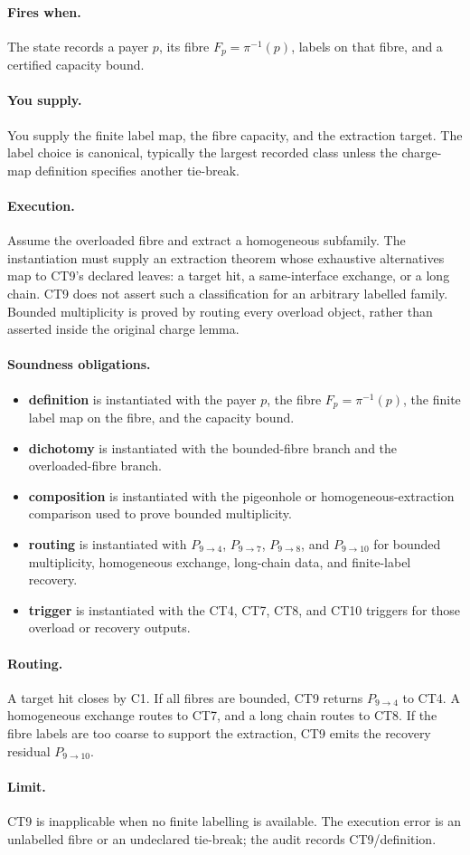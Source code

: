 \documentclass[
  11pt,
]{article}
\providecommand{\tightlist}{%
  \setlength{\itemsep}{0pt}\setlength{\parskip}{0pt}}
\theoremstyle{definition}
\newcommand{\ctpar}[1]{\paragraph{#1.}}
\begin{document}
\ctpar{Fires when}
The state records a payer \(p\), its fibre \(F_p=\pi^{-1}(p)\), labels
on that fibre, and a certified capacity bound.

\ctpar{You supply}
You supply the finite label map, the fibre capacity, and the extraction
target.  The label choice is canonical, typically the largest recorded
class unless the charge-map definition specifies another tie-break.

\ctpar{Execution}
Assume the overloaded fibre and extract a homogeneous subfamily. The
instantiation must supply an extraction theorem whose exhaustive
alternatives map to CT9's declared leaves: a target hit, a same-interface
exchange, or a long chain. CT9 does not assert such a classification for
an arbitrary labelled family. Bounded multiplicity is proved by routing
every overload object, rather than asserted inside the original charge
lemma.

\ctpar{Soundness obligations}
\begin{itemize}
\tightlist
\item \textbf{definition} is instantiated with the payer \(p\), the fibre \(F_p=\pi^{-1}(p)\), the finite label map on the fibre, and the capacity bound.
\item \textbf{dichotomy} is instantiated with the bounded-fibre branch and the overloaded-fibre branch.
\item \textbf{composition} is instantiated with the pigeonhole or homogeneous-extraction comparison used to prove bounded multiplicity.
\item \textbf{routing} is instantiated with \(P_{9\to4}\), \(P_{9\to7}\), \(P_{9\to8}\), and \(P_{9\to10}\) for bounded multiplicity, homogeneous exchange, long-chain data, and finite-label recovery.
\item \textbf{trigger} is instantiated with the CT4, CT7, CT8, and CT10 triggers for those overload or recovery outputs.
\end{itemize}

\ctpar{Routing}
A target hit closes by C1.  If all fibres are bounded, CT9 returns
\(P_{9\to4}\) to CT4.  A homogeneous exchange routes to CT7, and a long
chain routes to CT8.  If the fibre labels are too coarse to support the
extraction, CT9 emits the recovery residual \(P_{9\to10}\).

\ctpar{Limit}
CT9 is inapplicable when no finite labelling is available. The execution error
is an unlabelled fibre or an undeclared tie-break; the audit records
CT9/definition.
\end{document}
